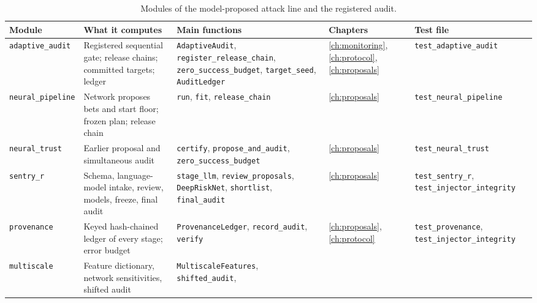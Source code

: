 \begin{table}[ht]
\centering
\caption{Modules of the model-proposed attack line and the registered audit.}
\label{app:tab-prop}
\footnotesize
\setlength{\tabcolsep}{3pt}
\begin{tabular}{@{}>{\raggedright\arraybackslash}p{2.2cm}>{\raggedright\arraybackslash}p{3.5cm}>{\raggedright\arraybackslash}p{3.9cm}>{\raggedright\arraybackslash}p{1.6cm}>{\raggedright\arraybackslash}p{2.9cm}@{}}
\toprule
Module & What it computes & Main functions & Chapters & Test file \\
\midrule
\texttt{adaptive\_\allowbreak{}audit} & Registered sequential gate; release chains;
committed targets; ledger & \texttt{AdaptiveAudit}, \texttt{register\_\allowbreak{}release\_\allowbreak{}chain},
\texttt{zero\_\allowbreak{}success\_\allowbreak{}budget}, \texttt{target\_\allowbreak{}seed}, \texttt{AuditLedger} &
\ref{ch:monitoring}, \ref{ch:protocol}, \ref{ch:proposals} &
\texttt{test\_\allowbreak{}adaptive\_\allowbreak{}audit} \\
\texttt{neural\_\allowbreak{}pipeline} & Network proposes bets and start floor; frozen
plan; release chain & \texttt{run}, \texttt{fit}, \texttt{release\_\allowbreak{}chain} &
\ref{ch:proposals} & \texttt{test\_\allowbreak{}neural\_\allowbreak{}pipeline} \\
\texttt{neural\_\allowbreak{}trust} & Earlier proposal and simultaneous audit &
\texttt{certify}, \texttt{propose\_\allowbreak{}and\_\allowbreak{}audit}, \texttt{zero\_\allowbreak{}success\_\allowbreak{}budget} &
\ref{ch:proposals} & \texttt{test\_\allowbreak{}neural\_\allowbreak{}trust} \\
\texttt{sentry\_\allowbreak{}r} & Schema, language-model intake, review, models, freeze, final
audit & \texttt{stage\_\allowbreak{}llm}, \texttt{review\_\allowbreak{}proposals}, \texttt{DeepRiskNet},
\texttt{shortlist}, \texttt{final\_\allowbreak{}audit} & \ref{ch:proposals} &
\texttt{test\_\allowbreak{}sentry\_\allowbreak{}r}, \texttt{test\_\allowbreak{}injector\_\allowbreak{}integrity} \\
\texttt{provenance} & Keyed hash-chained ledger of every stage; error budget &
\texttt{ProvenanceLedger}, \texttt{record\_\allowbreak{}audit}, \texttt{verify} &
\ref{ch:proposals}, \ref{ch:protocol} & \texttt{test\_\allowbreak{}provenance},
\texttt{test\_\allowbreak{}injector\_\allowbreak{}integrity} \\
\texttt{multiscale} & Feature dictionary, network sensitivities, shifted audit &
\texttt{MultiscaleFeatures}, \texttt{shifted\_\allowbreak{}audit},

\end{tabular}
\end{table}
